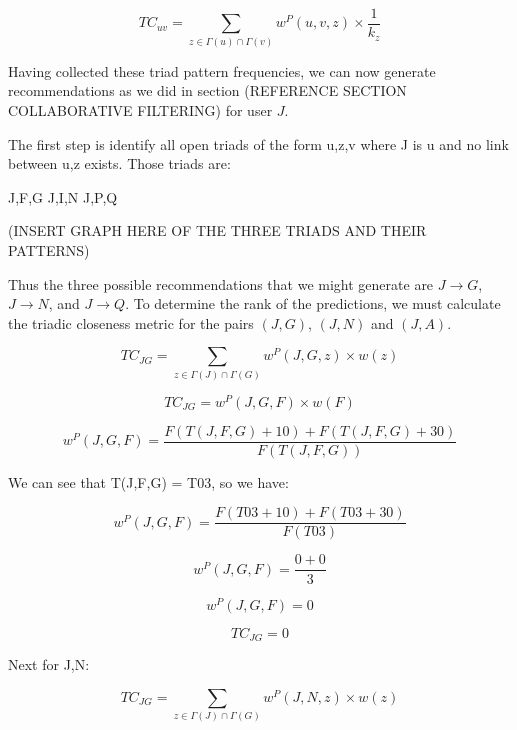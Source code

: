 \begin{equation}
TC_{uv} = \sum_{z\in \Gamma(u)\cap \Gamma(v)} w^{P}(u,v,z) \times \frac{1}{k_z}
\end{equation}

Having collected these triad pattern frequencies, we can now generate recommendations as we did in section (REFERENCE SECTION COLLABORATIVE FILTERING) for user $J$.

The first step is identify all open triads of the form u,z,v where J is u and no link between u,z exists. Those triads are:

J,F,G
J,I,N
J,P,Q

(INSERT GRAPH HERE OF THE THREE TRIADS AND THEIR PATTERNS)

Thus the three possible recommendations that we might generate are $J \rightarrow G$, $J \rightarrow N$, and $J \rightarrow Q$. To determine the rank of the predictions, we must calculate the triadic closeness metric for the pairs $(J,G)$, $(J,N)$ and $(J,A)$. 

\begin{equation}
TC_{JG} = \sum_{z\in \Gamma(J)\cap \Gamma(G)} w^{P}(J, G, z) \times w(z)  
\end{equation}

\begin{equation}
TC_{JG} = w^{P}(J, G, F) \times w(F)  
\end{equation}

\begin{equation}
w^{P}(J,G,F) = \frac{F(T(J,F,G) + 10) + F(T(J,F,G) + 30)}{F(T(J,F,G))}
\end{equation}

We can see that T(J,F,G) = T03, so we have:

\begin{equation}
w^{P}(J,G,F) = \frac{F(T03 + 10) + F(T03 + 30)}{F(T03)}
\end{equation}

\begin{equation}
w^{P}(J,G,F) = \frac{0 + 0}{3}
\end{equation}

\begin{equation}
w^{P}(J,G,F) = 0
\end{equation}

\begin{equation}
TC_{JG} = 0
\end{equation}

Next for J,N:

\begin{equation}
TC_{JG} = \sum_{z\in \Gamma(J)\cap \Gamma(G)} w^{P}(J, N, z) \times w(z)  
\end{equation}

